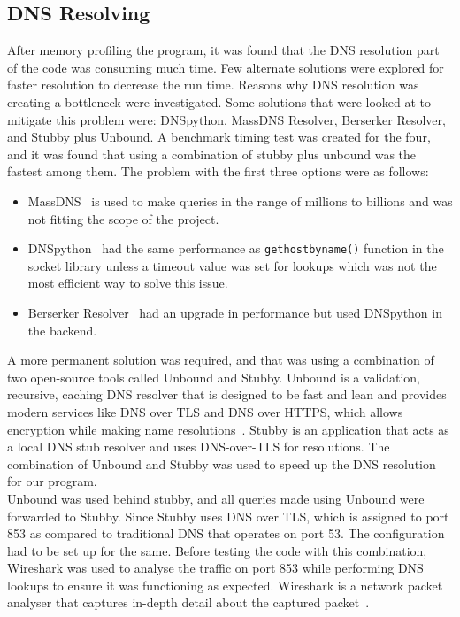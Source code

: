 \subsection{DNS Resolving}
After memory profiling the program, it was found that the DNS resolution part of the code was consuming much time. Few alternate solutions 
were explored for faster resolution to decrease the run time. Reasons why DNS resolution was creating a bottleneck were investigated. 
Some solutions that were looked at to mitigate this problem were: DNSpython, MassDNS Resolver, Berserker Resolver, and Stubby plus Unbound. 
A benchmark timing test was created for the four, and it was found that using a combination of stubby plus unbound was the fastest among them. 
The problem with the first three options were as follows: 
\begin{itemize}
    \item MassDNS~\cite{blechsch83:online} is used to make queries in the range of millions to billions and was not fitting the scope of the project. 
    \item DNSpython~\cite{dnspytho38:online} had the same performance as \verb|gethostbyname()| function in the socket library 
    unless a timeout value was set for lookups which was not the most efficient way to solve this issue.
    \item Berserker Resolver~\cite{berserke53:online} had an upgrade in performance but used DNSpython in the backend. 
\end{itemize} 
A more permanent solution was required, and that was using a combination of two open-source tools called Unbound and Stubby. Unbound is a 
validation, recursive, caching DNS resolver that is designed to be fast and lean and provides modern services like DNS over TLS and DNS over HTTPS, 
which allows encryption while making name resolutions~\cite{NLnetLab67:online}. Stubby is an application that acts as a local DNS stub 
resolver and uses DNS-over-TLS for resolutions. The combination of Unbound and Stubby was used to speed up the DNS resolution for our program.\\ 
Unbound was used behind stubby, and all queries made using Unbound were forwarded to Stubby. Since Stubby uses DNS over TLS, which is assigned to port 853 as compared to 
traditional DNS that operates on port 53. The configuration had to be set up for the same. Before testing the code with this combination, 
Wireshark was used to analyse the traffic on port 853 while performing DNS lookups to ensure it was functioning as expected. 
Wireshark is a network packet analyser that captures in-depth detail about the captured packet~\cite{Chapter148:online}.
\newpage


